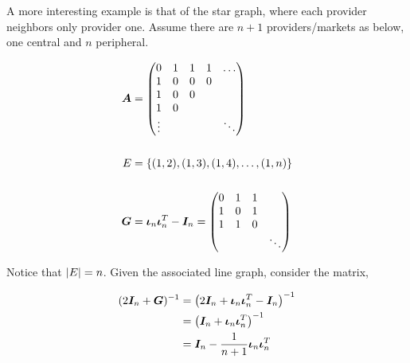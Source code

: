 A more interesting example is that of the star graph, where each provider neighbors only provider one. Assume there are $n + 1$ providers/markets as below, one central and $n$ peripheral.

\vspace{5mm}
\begin{minipage}{.5\textwidth}
  \resizebox{\textwidth}{!}{}
\end{minipage}
\begin{minipage}{.5\textwidth}
  \begin{equation*}
    \begin{split}
      \matr{A} &= \begin{pmatrix}
        0      & 1 & 1 & 1 & \ldots \\
        1      & 0 & 0 & 0 &        \\
        1      & 0 & 0 &   &        \\
        1      & 0 &   &   &        \\
        \vdots &   &   &   & \ddots
      \end{pmatrix} \\
      \vspace{5mm} \\
      E &= \set{(1, 2), (1, 3), (1, 4), \ldots, (1, n)} \\
      \vspace{5mm} \\
      \G &= \matr{\iota}_n \matr{\iota}_n^T - \I_n =  \begin{pmatrix}
        0 & 1 & 1 &        \\
        1 & 0 & 1 &        \\
        1 & 1 & 0 &        \\
          &   &   & \ddots
      \end{pmatrix}
    \end{split}
  \end{equation*}
\end{minipage}
\vspace{5mm}

Notice that $\lvert E\rvert = n$. Given the associated line graph, consider the matrix,

\begin{equation*}
  \begin{split}
    (2\bm{I}_n + \bm{G})^{-1} &= \left( 2\bm{I}_n + \bm{\iota}_n \bm{\iota}_n^T - \bm{I}_n \right)^{-1}\\
    &= \left( \bm{I}_n + \bm{\iota}_n \bm{\iota}_n^T \right)^{-1} \\
    &= \bm{I}_n - \frac{1}{n + 1} \bm{\iota}_n \bm{\iota}_n^T
  \end{split}
\end{equation*}

